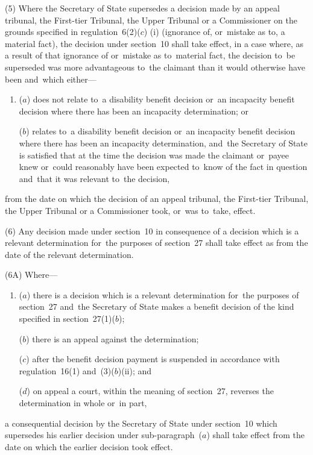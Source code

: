 \documentclass[12pt,a4paper]{article}
\begin{document}
(5) Where the Secretary of State supersedes a decision made by 
an appeal tribunal, the First-tier Tribunal, the Upper Tribunal or a Commissioner  %
on the grounds specified in regulation~6(2)($c$)%
(i)  %
(ignorance of, or~mistake as to, a material fact), the decision under section~10 shall take effect, in a case where, as a result of that ignorance of or~mistake as to~material fact, the decision to~be superseded was more advantageous to~the claimant than it would otherwise have been and~which either—
\begin{enumerate}\item[]
($a$) does not relate to~a disability benefit decision or~an incapacity benefit decision where there has been an incapacity determination; or

($b$) relates to~a disability benefit decision or~an incapacity benefit decision where there has been an incapacity determination, and~the Secretary of State is satisfied that at the time the decision was made the claimant or~payee knew or~could reasonably have been expected to~know of the fact in question and~that it was relevant to~the decision,
\end{enumerate}
from the date on which the decision of 
an appeal tribunal, the First-tier Tribunal, the Upper Tribunal or a Commissioner  %
took, or~was to~take, effect.

(6) Any decision made under section~10 in consequence of a decision which is a relevant determination for~the purposes of section~27 shall take effect as from the date of the relevant determination.

(6A) Where—
\begin{enumerate}\item[]
($a$) there is a decision which is a relevant determination for~the purposes of section~27 and~the Secretary of State makes a benefit decision of the kind specified in section~27(1)($b$);

($b$) there is an appeal against the determination;

($c$) after the benefit decision payment is suspended in accordance with regulation~16(1) and~(3)($b$)(ii); and

($d$) on appeal a court, within the meaning of section~27, reverses the determination in whole or~in part,
\end{enumerate}
a consequential decision by the Secretary of State under section~10 which supersedes his earlier decision under sub-paragraph~($a$)  shall take effect from the date on which the earlier decision took effect.
\end{document}
